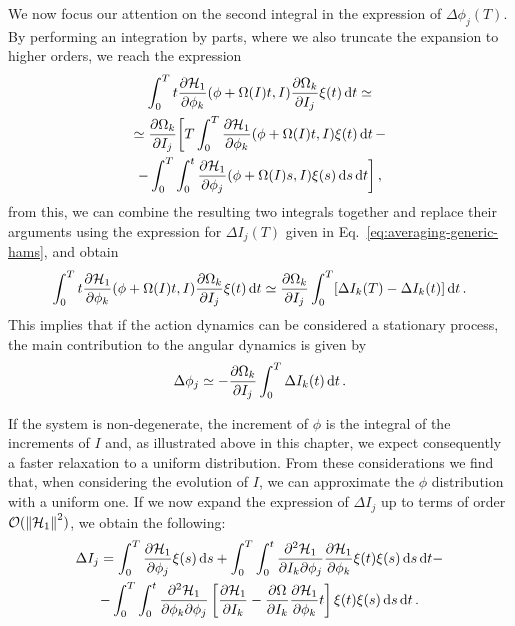 We now focus our attention on the second integral in the expression of \(\Delta\phi_j(T)\). By performing an integration by parts, where we also truncate the expansion to higher orders, we reach the expression
\begin{multline}
	\int_0^T t\pdv{\mathcal{H}_1}{\phi_k}\/(\phi+\Omega(I)t,I)\pdv{\Omega_k}{I_j}\xi(t)\,\mathrm{d}t \simeq \\
	\simeq \pdv{\Omega_k}{I_j}\/\bigg[T\int_0^T\pdv{\mathcal{H}_1}{\phi_k}\/(\phi+\Omega(I)t,I)\xi(t)\,\mathrm{d}t\, - \\
	- \int_0^T\int_0^t\pdv{\mathcal{H}_1}{\phi_j}\/(\phi+\Omega(I)s, I)\xi(s)\,\mathrm{d}s\,\mathrm{d}t\bigg]\,,
\end{multline}
from this, we can combine the resulting two integrals together and replace their arguments using the expression for $\Delta I_j(T)$ given in Eq.~\eqref{eq:averaging-generic-hams}, and obtain
\begin{equation}
	\int_0^T t\pdv{\mathcal{H}_1}{\phi_k}\/(\phi+\Omega(I)t,I)\pdv{\Omega_k}{I_j}\xi(t)\,\mathrm{d}t \simeq \pdv{\Omega_k}{I_j}\int_0^T[\Delta I_k(T)-\Delta I_k(t)]\,\mathrm{d}t\,.
\end{equation}
This implies that if the action dynamics can be considered a stationary process, the main contribution to the angular dynamics is given by
\begin{equation}
	\Delta \phi_j \simeq -\pdv{\Omega_k}{I_j}\int_0^T\Delta I_k(t)\,\mathrm{d}t\,.
\end{equation}

If the system is non-degenerate, %
the increment of $\phi$ is the integral of the increments of $I$ and, as illustrated above in this chapter, we expect consequently a faster relaxation to a uniform distribution. From these considerations we find that, when considering the evolution of $I$, we can approximate the $\phi$ distribution with a uniform one. If we now expand the expression of $\Delta I_j$ up to terms of order \(\mathcal{O}(\norm{\mathcal{H}_1}^2)\), we obtain the following:
\begin{multline}
	\Delta I_j = \int_0^T \pdv{\mathcal{H}_1}{\phi_j}\xi(s)\,\mathrm{d}s + \int_0^T\int_0^t \pdv{\mathcal{H}_1}{I_k}{\phi_j}\pdv{\mathcal{H}_1}{\phi_k}\xi(t)\xi(s)\,\mathrm{d}s\,\mathrm{d}t - \\
	- \int_0^T\int_0^t\pdv{\mathcal{H}_1}{\phi_k}{\phi_j}\left[\pdv{\mathcal{H}_1}{I_k}-\pdv{\Omega}{I_k}\pdv{\mathcal{H}_1}{\phi_k}t\right]\xi(t)\xi(s)\,\mathrm{d}s\,\mathrm{d}t\,.
\end{multline}

